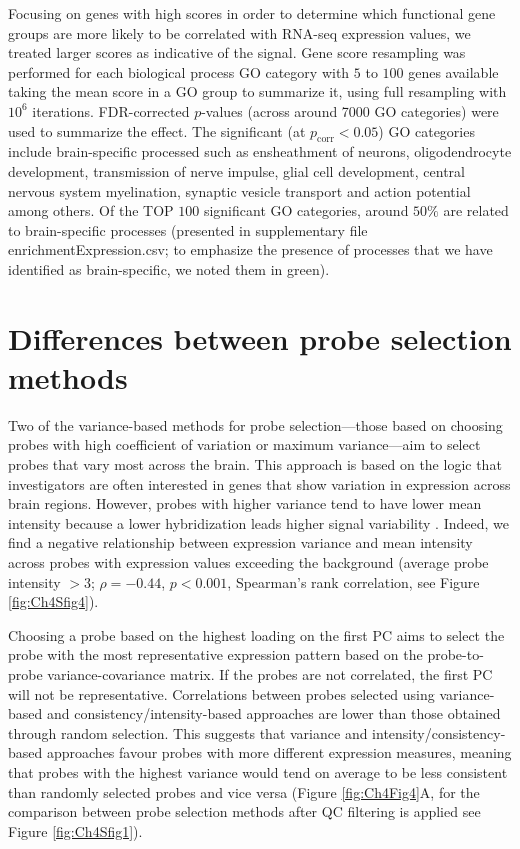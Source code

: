 Focusing on genes with high scores in order to determine which functional gene groups are more likely to be correlated with RNA-seq expression values, we treated larger scores as indicative of the signal. Gene score resampling was performed for each biological process GO category with $5$ to $100$ genes available taking the mean score in a GO group to summarize it, using full resampling with $10^{6}$ iterations. FDR-corrected $p$-values (across around \num{7000} GO categories) were used to summarize the effect. The significant (at $p_\mathrm{corr}<0.05$) GO categories include brain-specific processed such as ensheathment of neurons, oligodendrocyte development, transmission of nerve impulse, glial cell development, central nervous system myelination, synaptic vesicle transport and action potential among others. Of the TOP $100$ significant GO categories, around $50\%$ are related to brain-specific processes (presented in supplementary file enrichmentExpression.csv; to emphasize the presence of processes that we have identified as brain-specific, we noted them in green).


\section{Differences between probe selection methods}
\label{app:AppendixCh4_3}

Two of the variance-based methods for probe selection—those based on choosing probes with high coefficient of variation or maximum variance—aim to select probes that vary most across the brain. This approach is based on the logic that investigators are often interested in genes that show variation in expression across brain regions. However, probes with higher variance tend to have lower mean intensity because a lower hybridization leads higher signal variability \citep{Quackenbush2002a}. Indeed, we find a negative relationship between expression variance and mean intensity across probes with expression values exceeding the background (average probe intensity $> 3$; $\rho = -0.44$, $p < 0.001$, Spearman’s rank correlation, see Figure \ref{fig:Ch4Sfig4}).

Choosing a probe based on the highest loading on the first PC aims to select the probe with the most representative expression pattern based on the probe-to-probe variance-covariance matrix. If the probes are not correlated, the first PC will not be representative. Correlations between probes selected using variance-based and consistency/intensity-based approaches are lower than those obtained through random selection. This suggests that variance and intensity/consistency-based approaches favour probes with more different expression measures, meaning that probes with the highest variance would tend on average to be less consistent than randomly selected probes and vice versa (Figure \ref{fig:Ch4Fig4}A, for the comparison between probe selection methods after QC filtering is applied see Figure \ref{fig:Ch4Sfig1}).

